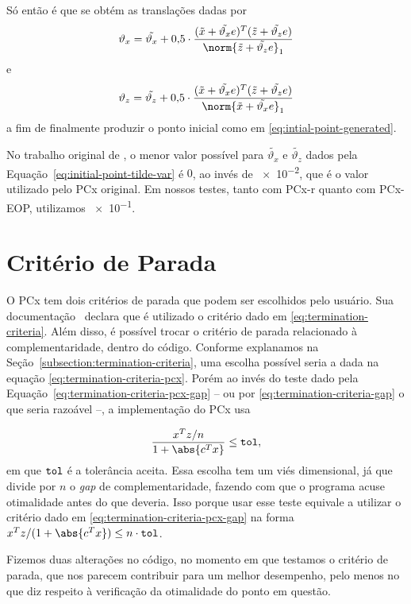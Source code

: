 Só então é que se obtém as translações dadas por 
\begin{equation}
	\label{eq:initial-point-var-x}
\vartheta_{x} = \tilde{\vartheta_x} + \num{0.5}\cdot\dfrac{(\xtil+\tilde{\vartheta_x} e)^{T}(\ztil+\tilde{\vartheta_z} e)}{\norm{\ztil+\tilde{\vartheta_z} e}_{1}} 
\end{equation}
e
\begin{equation}
	\label{eq:initial-point-var-z}
\vartheta_{z} = \tilde{\vartheta_z} + \num{0.5}\cdot\dfrac{(\xtil+\tilde{\vartheta_x} e)^{T}(\ztil+\tilde{\vartheta_z} e)}{\norm{\xtil+\tilde{\vartheta_x} e}_{1}} 
\end{equation}
a fim de finalmente produzir o ponto inicial como em \eqref{eq:intial-point-generated}.

No trabalho original de \textcite{Mehrotra:1992wr}, o menor valor possível para  $\tilde{\vartheta_x}$ e $\tilde{\vartheta_z}$ dados pela Equação~\eqref{eq:initial-point-tilde-var} é $\num{0}$, ao invés de \num{e-2}, 	que é o valor utilizado pelo PCx original. Em nossos testes, tanto com PCx-r quanto com PCx-EOP, utilizamos \num{e-1}.  


\section{Critério de Parada}


O PCx tem  dois critérios de parada que podem ser escolhidos pelo usuário. Sua   documentação~\cite{Czyzyk:1998vw} declara que é utilizado o critério dado em \eqref{eq:termination-criteria}.   Além disso, é possível trocar o critério de parada relacionado à complementaridade, dentro do código. Conforme explanamos na Seção~\ref{subsection:termination-criteria}, uma escolha possível seria a dada na equação \eqref{eq:termination-criteria-pcx}. Porém ao invés do teste dado pela Equação~\eqref{eq:termination-criteria-pcx-gap} -- ou por \eqref{eq:termination-criteria-gap} o que seria razoável --, a implementação do PCx usa

\[
\dfrac{x^{T}z/n}{1 + \abs{c^Tx}}\leq
	\tol,
\]
em que $\mathtt{tol}$ é a tolerância aceita. Essa escolha tem um viés dimensional, já que divide por $n$ o \emph{gap} de complementaridade, fazendo com que o programa acuse otimalidade  antes do que deveria. Isso porque usar esse teste equivale a utilizar  o critério dado em \eqref{eq:termination-criteria-pcx-gap} na forma $x^{T}z/(1 + \abs{c^Tx})\leq
	n\cdot \tol$. 


Fizemos duas  alterações no código, no momento em que testamos o critério de parada, que nos parecem  contribuir para um melhor desempenho, pelo menos  no que diz respeito à verificação da otimalidade do ponto em questão. 

